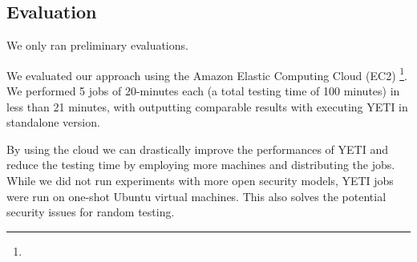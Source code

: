 \subsection{Evaluation}

We only ran preliminary evaluations.

We evaluated our approach using the Amazon Elastic Computing Cloud (EC2) \footnote{}.
We performed 5 jobs of 20-minutes each (a total testing time of 100 minutes) in less than 21 minutes, with outputting 
comparable results with executing YETI in standalone version.

By using the cloud we can drastically improve the performances of YETI and reduce the testing time by 
employing more machines and distributing the jobs.
While we did not run experiments with more open security models, 
YETI jobs were run on one-shot Ubuntu virtual machines. This also solves
the potential security issues for random testing.
